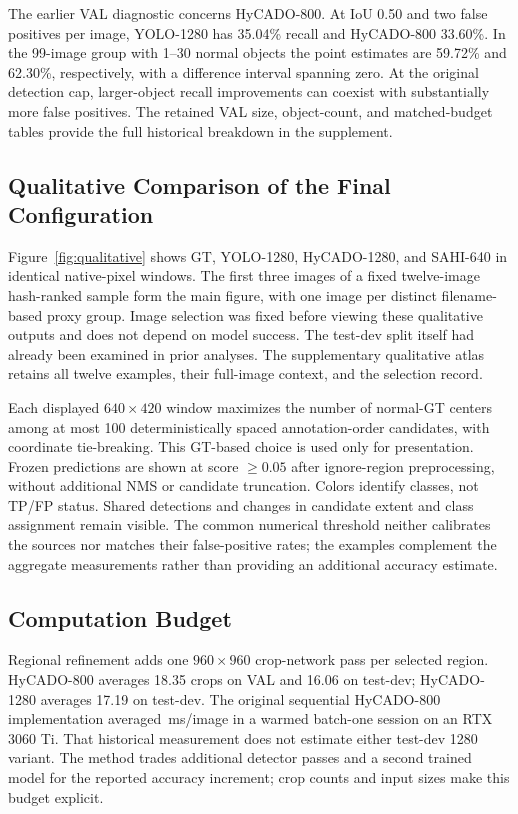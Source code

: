 \documentclass[journal]{IEEEtran}
\begin{document}
The earlier VAL diagnostic concerns HyCADO-800. At IoU 0.50 and two false positives per image, YOLO-1280 has 35.04\% recall and HyCADO-800 33.60\%. In the 99-image group with 1--30 normal objects the point estimates are 59.72\% and 62.30\%, respectively, with a difference interval spanning zero. At the original detection cap, larger-object recall improvements can coexist with substantially more false positives. The retained VAL size, object-count, and matched-budget tables provide the full historical breakdown in the supplement.

\subsection{Qualitative Comparison of the Final Configuration}
Figure~\ref{fig:qualitative} shows GT, YOLO-1280, HyCADO-1280, and SAHI-640 in identical native-pixel windows. The first three images of a fixed twelve-image hash-ranked sample form the main figure, with one image per distinct filename-based proxy group. Image selection was fixed before viewing these qualitative outputs and does not depend on model success. The test-dev split itself had already been examined in prior analyses. The supplementary qualitative atlas retains all twelve examples, their full-image context, and the selection record.

Each displayed $640\times420$ window maximizes the number of normal-GT centers among at most 100 deterministically spaced annotation-order candidates, with coordinate tie-breaking. This GT-based choice is used only for presentation. Frozen predictions are shown at score $\geq0.05$ after ignore-region preprocessing, without additional NMS or candidate truncation. Colors identify classes, not TP/FP status. Shared detections and changes in candidate extent and class assignment remain visible. The common numerical threshold neither calibrates the sources nor matches their false-positive rates; the examples complement the aggregate measurements rather than providing an additional accuracy estimate.



\subsection{Computation Budget}
Regional refinement adds one $960\times960$ crop-network pass per selected region. HyCADO-800 averages 18.35 crops on VAL and 16.06 on test-dev; HyCADO-1280 averages 17.19 on test-dev. The original sequential HyCADO-800 implementation averaged \HybridLatency\,ms/image in a warmed batch-one session on an RTX 3060 Ti. That historical measurement does not estimate either test-dev 1280 variant. The method trades additional detector passes and a second trained model for the reported accuracy increment; crop counts and input sizes make this budget explicit.
\end{document}
